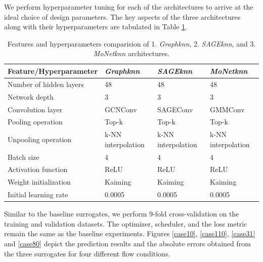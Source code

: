 We perform hyperparameter tuning for each of the architectures to arrive at the ideal choice of design parameters. The key aspects of the three architectures along with their hyperparameters are tabulated in Table \ref{prophp}. 
\begin{table}[ht]
    \centering
    \caption{Features and hyperparameters comparision of 1. \textit{Graphknn}, 2. \textit{SAGEknn}, and 3. \textit{MoNetknn} architectures.}
    \label{prophp}
    \begin{tabular}{|l|l|l|l|}
    \hline
    \textbf{Feature/Hyperparameter}    & \textit{Graphknn} & \textit{SAGEknn}   & \textit{MoNetknn} \\
    \hline
    Number of hidden layers    & 48 & 48 & 48                           \\
    \hline
    Network depth    & 3 & 3 & 3                          \\
    \hline
    Convolution layer             &     GCNConv & SAGEConv & GMMConv                   \\
    \hline
    Pooling operation             &    Top-k &  Top-k &  Top-k                     \\
    \hline
    Unpooling operation         &   k-NN interpolation&   k-NN interpolation&   k-NN interpolation                     \\
    \hline
    Batch size                 & 4 & 4& 4                         \\
    \hline
    Activation function        & ReLU  & ReLU  & ReLU                       \\
    \hline
    Weight initialization    &  Kaiming &  Kaiming &  Kaiming                        \\
    \hline
    Initial learning rate       & 0.0005 & 0.0005 & 0.0005                        \\
    \hline
    \end{tabular}
    \end{table}

Similar to the baseline surrogates, we perform 9-fold cross-validation on the training and validation datasets. The optimizer, scheduler, and the loss metric remain the same as the baseline experiments. Figures \ref{case10}, \ref{case110}, \ref{case31} and \ref{case80} depict the prediction results and the absolute errors obtained from the three surrogates for four different flow conditions. 

